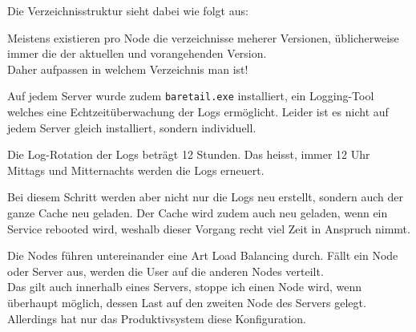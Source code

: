 \begin{flushleft}
    Die Verzeichnisstruktur sieht dabei wie folgt aus:



%


    \begin{mdframed}
    Meistens existieren pro Node die verzeichnisse meherer Versionen, üblicherweise immer die der aktuellen und vorangehenden Version.\\Daher aufpassen in welchem Verzeichnis man ist!
    \end{mdframed}

    Auf jedem Server wurde zudem \texttt{baretail.exe} installiert, ein Logging-Tool welches eine Echtzeitüberwachung der Logs ermöglicht.
    Leider ist es nicht auf jedem Server gleich installiert, sondern individuell.
\end{flushleft}
\begin{flushleft}
    Die Log-Rotation der Logs beträgt 12 Stunden.
    Das heisst, immer 12 Uhr Mittags und Mitternachts werden die Logs erneuert.

    Bei diesem Schritt werden aber nicht nur die Logs neu erstellt, sondern auch der ganze Cache neu geladen.
    Der Cache wird zudem auch neu geladen, wenn ein Service rebooted wird, weshalb dieser Vorgang recht viel Zeit in Anspruch nimmt.
\end{flushleft}
\begin{flushleft}
    Die Nodes führen untereinander eine Art Load Balancing durch.
    Fällt ein Node oder Server aus, werden die User auf die anderen Nodes verteilt.\\
    Das gilt auch innerhalb eines Servers, stoppe ich einen Node wird, wenn überhaupt möglich, dessen Last auf den zweiten Node des Servers gelegt.\\
    Allerdings hat nur das Produktivsystem diese Konfiguration.
\end{flushleft}
